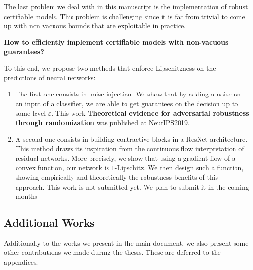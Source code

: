 The last problem we deal with in this manuscript is the implementation of robust certifiable models. This problem is challenging since it is far from trivial to come up with non vacuous bounds that are exploitable in practice.
\medskip
\begin{tcolorbox}[title=Question 3]
\textbf{How to efficiently implement certifiable models with non-vacuous guarantees?}
\end{tcolorbox}
\medskip
To this end, we propose two methods that enforce Lipschitzness on the predictions of neural networks:
\begin{enumerate}
    \item The first one consists in noise injection. We show that by adding a noise on an input of a classifier, we are able to get guarantees on the decision up to some level $\varepsilon$. This work \textbf{Theoretical evidence for adversarial robustness through randomization} was published at NeurIPS2019.
    \item A second one consists in building contractive blocks in a ResNet architecture. This method draws its inspiration from the continuous flow interpretation of residual networks. More precisely, we show that using a gradient flow of a convex function, our network is $1$-Lipschitz. We then design such a function, showing empirically and theoretically the robustness benefits of this approach. This work is not submitted yet. We plan to submit it in the coming months

\end{enumerate}

\subsection{Additional Works}
Additionally to the works we present in the main document, we also present some other contributions we made during the thesis. These are deferred to the appendices. 

